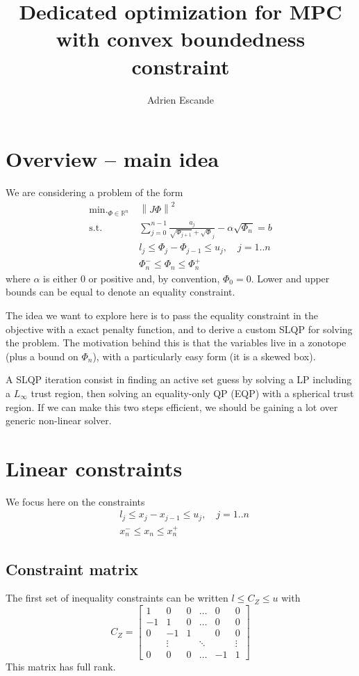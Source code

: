 \documentclass[]{article}
\newcommand{\BIN}{\begin{bmatrix}}
\newcommand{\BOUT}{\end{bmatrix}}
\DeclareMathOperator*{\minimize}{\min.}
\newcommand{\st}{\mbox{s.t.}}
\begin{document}
\title{\Large Dedicated optimization for MPC with convex boundedness constraint}
\author{Adrien Escande}

\maketitle

\section{Overview -- main idea}
We are considering a problem of the form
\begin{align}
  \minimize_{\Phi \in \mathbb{R}^n}\ & \left\| J \Phi \right\|^2 \label{eq:problem}\\
  \st \ & \sum_{j=0}^{n-1} \frac{a_j}{\sqrt{\Phi_{j+1}} + \sqrt{\Phi}_j} - \alpha \sqrt{\Phi_n} = b \nonumber\\
        & l_j \leq \Phi_j - \Phi_{j-1} \leq u_j, \quad j=1..n \nonumber\\
        & \Phi_n^- \leq \Phi_n \leq \Phi_n^+ \nonumber
\end{align}
where $\alpha$ is either $0$ or positive and, by convention, $\Phi_0 = 0$. Lower and upper bounds can be equal to denote an equality constraint.

The idea we want to explore here is to pass the equality constraint in the objective with a exact penalty function, and to derive a custom SLQP for solving the problem. The motivation behind this is that the variables live in a zonotope (plus a bound on $\Phi_n$), with a particularly easy form (it is a skewed box).

A SLQP iteration consist in finding an active set guess by solving a LP including a $L_\infty$ trust region, then solving an equality-only QP (EQP) with a spherical trust region. If we can make this two steps efficient, we should be gaining a lot over generic non-linear solver.


\section{Linear constraints}
We focus here on the constraints
\begin{align*}
 & l_j \leq x_j - x_{j-1} \leq u_j, \quad j=1..n \label{eq:inequality}\\
 & x_n^- \leq x_n \leq x_n^+
\end{align*}

\subsection{Constraint matrix}
The first set of inequality constraints can be written $l \leq C_Z \leq u$ with
\begin{equation}
  C_Z = \BIN  1 &  0 & 0 & \ldots &  0 & 0\\
             -1 &  1 & 0 & \ldots &  0 & 0\\
              0 & -1 & 1 &        &  0 & 0\\
                & \vdots &&\ddots &    & \vdots \\
              0 &  0 & 0 & \ldots & -1 & 1\BOUT 
\end{equation}
This matrix has full rank.
\end{document}
